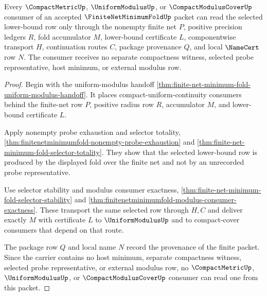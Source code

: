 \begin{theorem}
\label{thm:finite-net-minimum-fold-compact-cover-consumer}
Every $\CompactMetricUp$, $\UniformModulusUp$, or $\CompactModulusCoverUp$ consumer of an accepted $\FiniteNetMinimumFoldUp$ packet can read the selected lower-bound row only through the nonempty finite net $P$, positive precision ledgers $R$, fold accumulator $M$, lower-bound certificate $L$, componentwise transport $H$, continuation routes $C$, package provenance $Q$, and local $\NameCert$ row $N$. The consumer receives no separate compactness witness, selected probe representative, host minimum, or external modulus row.
\end{theorem}
\begin{proof}
Begin with the uniform-modulus handoff \autoref{thm:finite-net-minimum-fold-uniform-modulus-handoff}. It places compact-uniform-continuity consumers behind the finite-net row $P$, positive radius row $R$, accumulator $M$, and lower-bound certificate $L$.

Apply nonempty probe exhaustion and selector totality, \autoref{thm:finitenetminimumfold-nonempty-probe-exhaustion} and \autoref{thm:finite-net-minimum-fold-selector-totality}. They show that the selected lower-bound row is produced by the displayed fold over the finite net and not by an unrecorded probe representative.

Use selector stability and modulus consumer exactness, \autoref{thm:finite-net-minimum-fold-selector-stability} and \autoref{thm:finitenetminimumfold-modulus-consumer-exactness}. These transport the same selected row through $H,C$ and deliver exactly $M$ with certificate $L$ to $\UniformModulusUp$ and to compact-cover consumers that depend on that route.

The package row $Q$ and local name $N$ record the provenance of the finite packet. Since the carrier contains no host minimum, separate compactness witness, selected probe representative, or external modulus row, no $\CompactMetricUp$, $\UniformModulusUp$, or $\CompactModulusCoverUp$ consumer can read one from this packet.
\end{proof}


